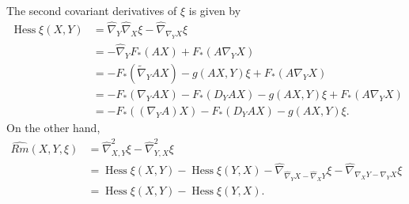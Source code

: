 \documentclass{amsart}
\theoremstyle{definition}
\theoremstyle{remark}
\numberwithin{equation}{section}
\begin{document}
The second covariant derivatives of $ \xi$ is given by
\begin{align}
\operatorname{Hess}\xi(X,Y)&=\hat{\nabla}_Y\hat{\nabla}_X\xi-\hat{\nabla}_{\nabla_YX}\xi\\
&=-\hat{\nabla}_YF_{\ast}(AX)+F_{\ast}(A\nabla_YX)\nonumber\\
&=-F_{\ast}(\tilde{\nabla}_{Y}AX)-g(A X,Y)\xi+F_{\ast}(A\nabla_YX)\nonumber\\
&=-F_{\ast}(\nabla_{Y}AX)-F_{\ast}(D_{Y}AX)-g(A X,Y)\xi+F_{\ast}(A\nabla_YX)\nonumber\\
&=-F_{\ast}((\nabla_Y A)X)-F_{\ast}(D_{Y}AX)-g(A X,Y)\xi.\nonumber
\end{align}
On the other hand,
\begin{align}
\widehat{Rm}(X,Y,\xi)&=\hat{\nabla}^2_{X,Y}\xi-\hat{\nabla}^2_{Y,X}\xi\\
&=\operatorname{Hess}\xi(X,Y)-\operatorname{Hess}\xi(Y,X)-\hat{\nabla}_{\hat{\nabla}_YX-\hat{\nabla}_XY}\xi-\hat{\nabla}_{\nabla_XY-\nabla_YX}\xi\nonumber\\
&=\operatorname{Hess}\xi(X,Y)-\operatorname{Hess}\xi(Y,X).\nonumber
\end{align}
\end{document}
